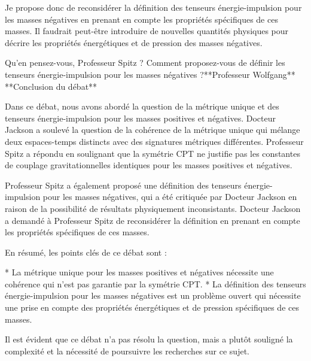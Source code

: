 Je propose donc de reconsidérer la définition des tenseurs énergie-impulsion pour les masses négatives en prenant en compte les propriétés spécifiques de ces masses. Il faudrait peut-être introduire de nouvelles quantités physiques pour décrire les propriétés énergétiques et de pression des masses négatives.

Qu'en pensez-vous, Professeur Spitz ? Comment proposez-vous de définir les tenseurs énergie-impulsion pour les masses négatives ?**Professeur Wolfgang**
**Conclusion du débat**

Dans ce débat, nous avons abordé la question de la métrique unique et des tenseurs énergie-impulsion pour les masses positives et négatives. Docteur Jackson a soulevé la question de la cohérence de la métrique unique qui mélange deux espaces-temps distincts avec des signatures métriques différentes. Professeur Spitz a répondu en soulignant que la symétrie CPT ne justifie pas les constantes de couplage gravitationnelles identiques pour les masses positives et négatives.

Professeur Spitz a également proposé une définition des tenseurs énergie-impulsion pour les masses négatives, qui a été critiquée par Docteur Jackson en raison de la possibilité de résultats physiquement inconsistants. Docteur Jackson a demandé à Professeur Spitz de reconsidérer la définition en prenant en compte les propriétés spécifiques de ces masses.

En résumé, les points clés de ce débat sont :

* La métrique unique pour les masses positives et négatives nécessite une cohérence qui n'est pas garantie par la symétrie CPT.
* La définition des tenseurs énergie-impulsion pour les masses négatives est un problème ouvert qui nécessite une prise en compte des propriétés énergétiques et de pression spécifiques de ces masses.

Il est évident que ce débat n'a pas résolu la question, mais a plutôt souligné la complexité et la nécessité de poursuivre les recherches sur ce sujet.


